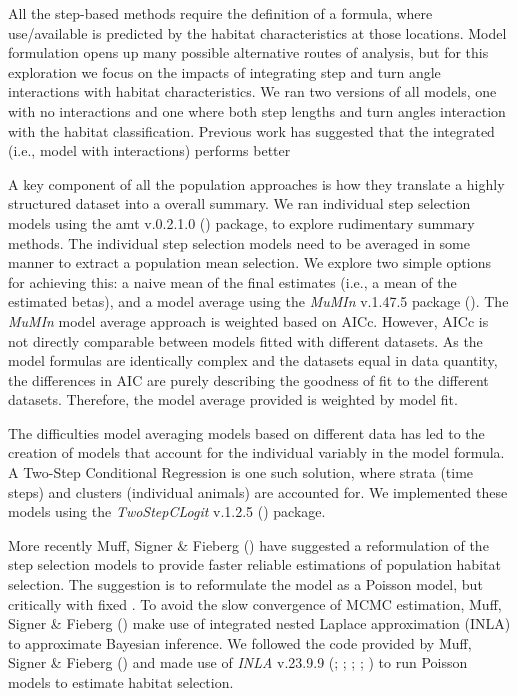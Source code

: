 \documentclass[10pt,a4paper]{article}
\begin{document}
All the step-based methods require the definition of a formula, where use/available is predicted by the habitat characteristics at those locations.
Model formulation opens up many possible alternative routes of analysis, but for this exploration we focus on the impacts of integrating step and turn angle interactions with habitat characteristics.
We ran two versions of all models, one with no interactions and one where both step lengths and turn angles interaction with the habitat classification.
Previous work has suggested that the integrated (i.e., model with interactions) performs better

A key component of all the population approaches is how they translate a highly structured dataset into a overall summary.
We ran individual step selection models using the amt v.0.2.1.0 () package, to explore rudimentary summary methods.
The individual step selection models need to be averaged in some manner to extract a population mean selection.
We explore two simple options for achieving this: a naive mean of the final estimates (i.e., a mean of the estimated betas), and a model average using the \emph{MuMIn} v.1.47.5 package ().
The \emph{MuMIn} model average approach is weighted based on AICc.
However, AICc is not directly comparable between models fitted with different datasets.
As the model formulas are identically complex and the datasets equal in data quantity, the differences in AIC are purely describing the goodness of fit to the different datasets.
Therefore, the model average provided is weighted by model fit.

The difficulties model averaging models based on different data has led to the creation of models that account for the individual variably in the model formula.
A Two-Step Conditional Regression is one such solution, where strata (time steps) and clusters (individual animals) are accounted for.
We implemented these models using the \emph{TwoStepCLogit} v.1.2.5 () package.

More recently Muff, Signer \& Fieberg () have suggested a reformulation of the step selection models to provide faster reliable estimations of population habitat selection.
The suggestion is to reformulate the model as a Poisson model, but critically with fixed .
To avoid the slow convergence of MCMC estimation, Muff, Signer \& Fieberg () make use of integrated nested Laplace approximation (INLA) to approximate Bayesian inference.
We followed the code provided by Muff, Signer \& Fieberg () and made use of \emph{INLA} v.23.9.9 (; ; ; ; ) to run Poisson models to estimate habitat selection.
\end{document}
